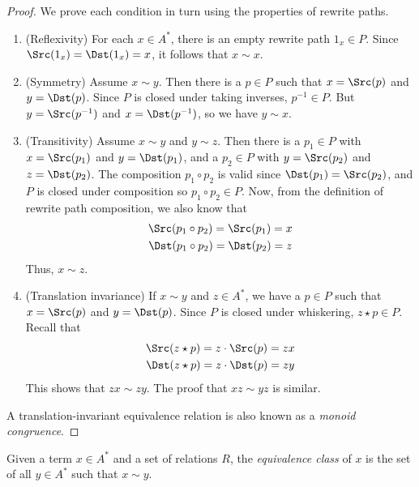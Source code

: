 \documentclass[../generics]{subfiles}
\begin{document}
\begin{proof}
We prove each condition in turn using the properties of rewrite paths.
\begin{enumerate}
\item (Reflexivity) For each $x\in A^*$, there is an empty rewrite path $1_x\in P$. Since $\Src(1_x)=\Dst(1_x)=x$, it follows that $x\sim x$.
\item (Symmetry) Assume $x\sim y$. Then there is a $p\in P$ such that $x=\Src(p)$ and $y=\Dst(p)$. Since $P$ is closed under taking inverses, $p^{-1}\in P$. But $y=\Src(p^{-1})$ and $x=\Dst(p^{-1})$, so we have $y\sim x$.
\item (Transitivity) Assume $x\sim y$ and $y\sim z$. Then there is a $p_1\in P$ with $x=\Src(p_1)$ and $y=\Dst(p_1)$, and a $p_2\in P$ with $y=\Src(p_2)$ and $z=\Dst(p_2)$. The composition $p_1\circ p_2$ is valid since $\Dst(p_1)=\Src(p_2)$, and $P$ is closed under composition so $p_1\circ p_2 \in P$. Now, from the definition of rewrite path composition, we also know that
\begin{gather*}
\Src(p_1\circ p_2)=\Src(p_1)=x\\
\Dst(p_1\circ p_2)=\Dst(p_2)=z
\end{gather*}
Thus, $x\sim z$.
\item (Translation invariance) If $x\sim y$ and $z\in A^*$, we have a $p\in P$ such that $x=\Src(p)$ and $y=\Dst(p)$. Since $P$ is closed under whiskering, $z\star p\in P$. Recall that
\begin{gather*}
\Src(z\star p)=z\cdot \Src(p)=zx\\
\Dst(z\star p)=z\cdot \Dst(p)=zy
\end{gather*}
This shows that $zx \sim zy$. The proof that $xz \sim yz$ is similar.
\end{enumerate}
A translation-invariant equivalence relation is also known as a \emph{monoid congruence}.
\end{proof}

Given a term $x\in A^*$ and a set of relations $R$, the \emph{equivalence class} of $x$ is the set of all $y\in A^*$ such that $x\sim y$.
\end{document}
